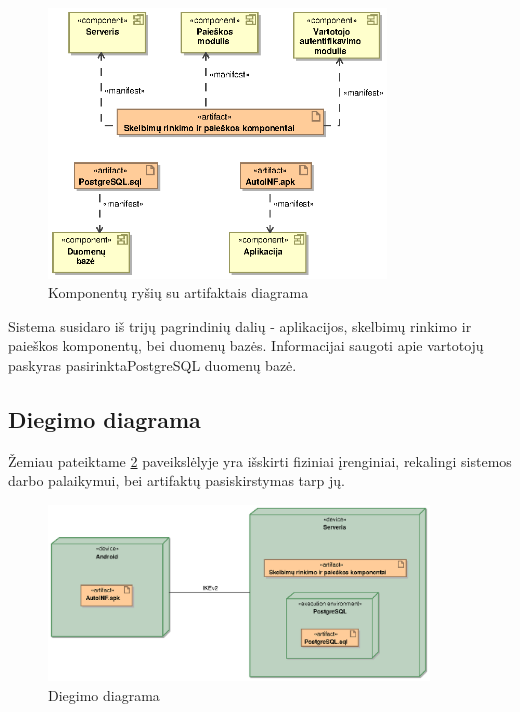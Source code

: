 \documentclass[12pt]{article}
\begin{document}
	\begin{figure}[h]
		\begin{center}
			\includegraphics[width=0.8\textwidth]{ArtifaktaiKomponentai.eps}
			\caption{Komponentų ryšių su artifaktais diagrama\label{ArtComp}}
		\end{center}
	\end{figure}

	\begin{indent}
	Sistema susidaro iš trijų pagrindinių dalių - aplikacijos, skelbimų rinkimo ir paieškos komponentų, bei duomenų bazės. Informacijai saugoti apie vartotojų paskyras pasirinkta\break PostgreSQL duomenų bazė.
	\end{indent}
	\pagebreak
	
	\subsection{Diegimo diagrama}
	
	Žemiau pateiktame \ref{Cube} paveikslėlyje yra išskirti fiziniai įrenginiai, rekalingi sistemos darbo palaikymui, bei artifaktų pasiskirstymas tarp jų.\\
	
	\begin{figure}[h]
		\begin{center}
			\includegraphics[width=0.9\textwidth]{Mazgai.eps}
			\caption{Diegimo diagrama\label{Cube}}
		\end{center}
	\end{figure}
	
\end{document}
